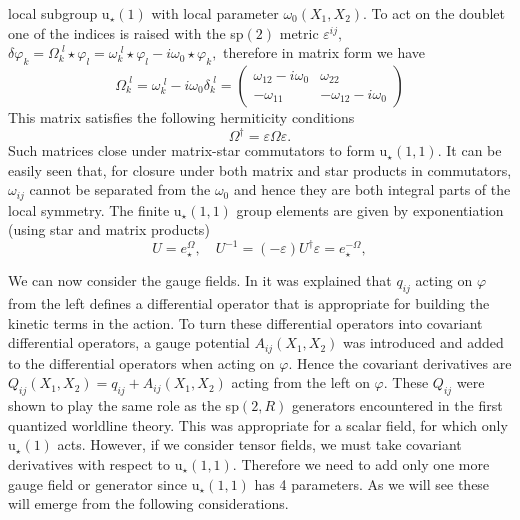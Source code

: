\documentclass[a4paper,12pt]{article}
\begin{document}
local subgroup u$_{\star }\left( 1\right) $ with local parameter $\omega
_{0}\left( X_{1},X_{2}\right) $. To act on the doublet one of the indices is
raised with the sp$\left( 2\right) $ metric $\varepsilon ^{ij},$ $\delta
\varphi _{k}=\Omega _{k}^{\,\,l}\star \varphi _{l}=\omega _{k}^{\,\,l}\star
\varphi _{l}-i\omega _{0}\star \varphi _{k},$ therefore in matrix form we
have 
\begin{equation}
\Omega _{k}^{\,\,l}=\omega _{k}^{\,\,l}-i\omega _{0}\delta
_{k}^{\,\,l}=\left( 
\begin{array}{cc}
\omega _{12}-i\omega _{0} & \omega _{22} \\ 
-\omega _{11} & -\omega _{12}-i\omega _{0}
\end{array}
\right)
\end{equation}
This matrix satisfies the following hermiticity conditions 
\begin{equation}
\Omega ^{\dagger }=\varepsilon \Omega \varepsilon .
\end{equation}
Such matrices close under matrix-star commutators to form u$_{\star }\left(
1,1\right) .$ It can be easily seen that, for closure under both matrix and
star products in commutators, $\omega _{ij}$ cannot be separated from the $%
\omega _{0}$ and hence they are both integral parts of the local symmetry.
The finite u$_{\star }\left( 1,1\right) $ group elements are given by
exponentiation (using star and matrix products) 
\begin{equation}
U=e_{\star }^{\Omega },\quad U^{-1}=\left( -\varepsilon \right) U^{\dagger
}\varepsilon =e_{\star }^{-\Omega },  \label{U}
\end{equation}

We can now consider the gauge fields. In \cite{NCSp} it was explained that $%
q_{ij}$ acting on $\varphi $ from the left defines a differential operator
that is appropriate for building the kinetic terms in the action. To turn
these differential operators into covariant differential operators, a gauge
potential $A_{ij}\left( X_{1},X_{2}\right) $ was introduced and added to the
differential operators when acting on $\varphi .$ Hence the covariant
derivatives are $Q_{ij}\left( X_{1},X_{2}\right) =q_{ij}+A_{ij}\left(
X_{1},X_{2}\right) $ acting from the left on $\varphi .$ These $Q_{ij}$ were
shown to play the same role as the sp$\left( 2,R\right) $ generators
encountered in the first quantized worldline theory. This was appropriate
for a scalar field, for which only u$_{\star }\left( 1\right) $ acts.
However, if we consider tensor fields, we must take covariant derivatives
with respect to u$_{\star }\left( 1,1\right) .$ Therefore we need to add
only one more gauge field or generator since u$_{\star }\left( 1,1\right) $
has 4 parameters. As we will see these will emerge from the following
considerations.
\end{document}
